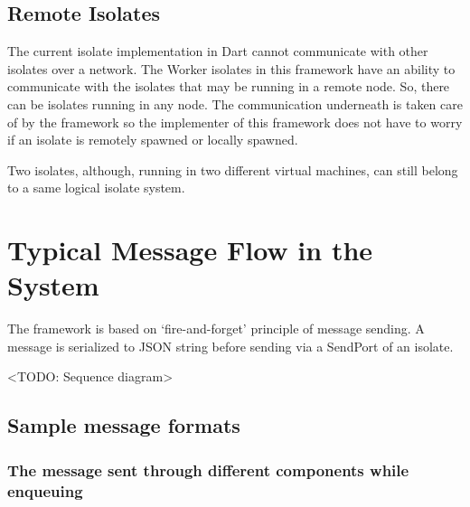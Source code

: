 \subsection{Remote Isolates}
\label{subsec:remoteIsolate}
  The current isolate implementation in Dart cannot communicate with other isolates over a network. The Worker isolates in this framework have an ability to communicate with the isolates that may be running in a remote node. So, there can be isolates running in any node. The communication underneath is taken care of by the framework so the implementer of this framework does not have to worry if an isolate is remotely spawned or locally spawned.

  Two isolates, although, running in two different virtual machines, can still belong to a same logical isolate system.

\section{Typical Message Flow in the System}
The framework is based on ‘fire-and-forget’ principle of message sending.
A message is serialized to JSON string before sending via a SendPort of an isolate.

<TODO: Sequence diagram>

\subsection{Sample message formats}

\subsubsection{The message sent through different components while enqueuing}

